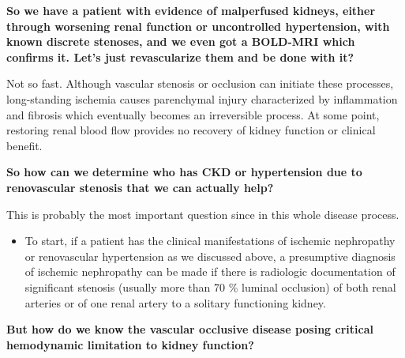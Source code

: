 \documentclass[
]{book}
\providecommand{\tightlist}{%
  \setlength{\itemsep}{0pt}\setlength{\parskip}{0pt}}
\begin{document}
\textbf{So we have a patient with evidence of malperfused kidneys, either
through worsening renal function or uncontrolled hypertension, with
known discrete stenoses, and we even got a BOLD-MRI which confirms it.
Let's just revascularize them and be done with it?}

Not so fast. Although vascular stenosis or occlusion can initiate these
processes, long-standing ischemia causes parenchymal injury
characterized by inflammation and fibrosis which eventually becomes an
irreversible process. At some point, restoring renal blood flow provides
no recovery of kidney function or clinical benefit.

\textbf{So how can we determine who has CKD or hypertension due to
renovascular stenosis that we can actually help?}

This is probably the most important question since in this whole disease
process.

\begin{itemize}
\tightlist
\item
  To start, if a patient has the clinical manifestations of ischemic
  nephropathy or renovascular hypertension as we discussed above, a
  presumptive diagnosis of ischemic nephropathy can be made if there
  is radiologic documentation of significant stenosis (usually more
  than 70 \% luminal occlusion) of both renal arteries or of one renal
  artery to a solitary functioning kidney.
\end{itemize}

\textbf{But how do we know the vascular occlusive disease posing critical
hemodynamic limitation to kidney function?}
\end{document}
